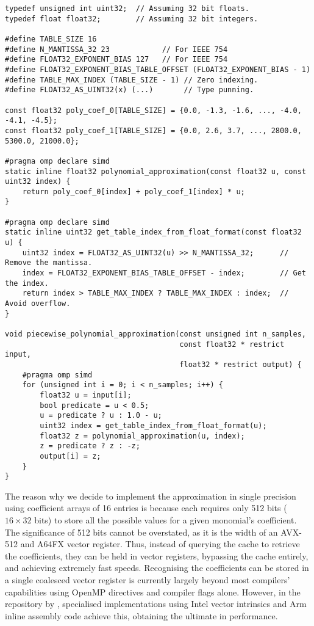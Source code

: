 \documentclass[9pt,a4paper,english]{extarticle}
\begin{document}
\begin{lstfloat}[h!tb]
\begin{lstlisting}[style=C, caption={C implementation of the piecewise linear approximation.}, label={code:piecewise_linear_approximation}]
typedef unsigned int uint32;  // Assuming 32 bit floats. 
typedef float float32;        // Assuming 32 bit integers. 

#define TABLE_SIZE 16
#define N_MANTISSA_32 23            // For IEEE 754
#define FLOAT32_EXPONENT_BIAS 127   // For IEEE 754
#define FLOAT32_EXPONENT_BIAS_TABLE_OFFSET (FLOAT32_EXPONENT_BIAS - 1)
#define TABLE_MAX_INDEX (TABLE_SIZE - 1) // Zero indexing.
#define FLOAT32_AS_UINT32(x) (...)       // Type punning.

const float32 poly_coef_0[TABLE_SIZE] = {0.0, -1.3, -1.6, ..., -4.0, -4.1, -4.5};
const float32 poly_coef_1[TABLE_SIZE] = {0.0, 2.6, 3.7, ..., 2800.0, 5300.0, 21000.0};

#pragma omp declare simd
static inline float32 polynomial_approximation(const float32 u, const uint32 index) {
    return poly_coef_0[index] + poly_coef_1[index] * u;
}

#pragma omp declare simd
static inline uint32 get_table_index_from_float_format(const float32 u) {
    uint32 index = FLOAT32_AS_UINT32(u) >> N_MANTISSA_32;      // Remove the mantissa.
    index = FLOAT32_EXPONENT_BIAS_TABLE_OFFSET - index;        // Get the index.
    return index > TABLE_MAX_INDEX ? TABLE_MAX_INDEX : index;  // Avoid overflow.
}

void piecewise_polynomial_approximation(const unsigned int n_samples,
                                        const float32 * restrict input, 
                                        float32 * restrict output) {
    #pragma omp simd 
    for (unsigned int i = 0; i < n_samples; i++) {
        float32 u = input[i];
        bool predicate = u < 0.5;
        u = predicate ? u : 1.0 - u;
        uint32 index = get_table_index_from_float_format(u);
        float32 z = polynomial_approximation(u, index);
        z = predicate ? z : -z;
        output[i] = z;
    }
}
\end{lstlisting}
\end{lstfloat}

The reason why we decide to implement the approximation in single precision using coefficient arrays of 16 entries is because each requires only 512 bits ($ 16 \times 32 $ bits) to store all the possible values for a given monomial's coefficient. The significance of 512 bits cannot be overstated, as it is the width of an AVX-512 and A64FX vector register. Thus, instead of querying the cache to retrieve the coefficients, they can be held in vector registers, bypassing the cache entirely, and achieving extremely fast speeds. Recognising the coefficients can be stored in a single coalesced vector register is currently largely beyond most compilers' capabilities using OpenMP directives and compiler flags alone. However, in the repository by \citet{sheridan2020approximate_random}, specialised implementations using Intel vector intrinsics and Arm inline assembly code achieve this, obtaining the ultimate in performance. 
\end{document}
